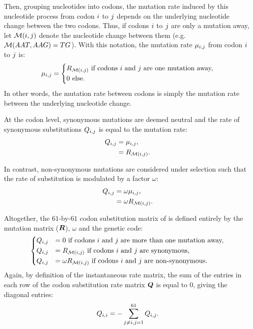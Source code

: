 Then, grouping nucleotides into codons, the mutation rate induced by this nucleotide process from codon ${i}$ to ${j}$ depends on the underlying nucleotide change between the two codons.
Thus, if codons ${i}$ to ${j}$ are only a mutation away, let $\mathcal{M}({i}, {j})$ denote the nucleotide change between them (e.g.~$\mathcal{M}(AAT, AAG) = TG$).
With this notation, the mutation rate $\mu_{{i}, {j}}$ from codon ${i}$ to ${j}$ is:
\begin{equation}
    \mu_{{i}, {j}} =
    \begin{dcases}
        R_{\mathcal{M}({i}, {j})} \text{ if codons ${i}$ and ${j}$ are one mutation away,} \\
        0 \text{ else.}
    \end{dcases}
\end{equation}
In other words, the mutation rate between codons is simply the mutation rate between the underlying nucleotide change.

At the codon level, synonymous mutations are deemed neutral and the rate of synonymous substitutions ${Q_{{i}, {j}}}$ is equal to the mutation rate:
\begin{align}
    Q_{{i}, {j}} & = \mu_{{i}, {j}}, \\
    & = R_{\mathcal{M}({i}, {j})}.
\end{align}

In contrast, non-synonymous mutations are considered under selection such that the rate of substitution is modulated by a factor $\omega$:
\begin{align}
    Q_{{i}, {j}} & = \omega \mu_{{i}, {j}}, \\
    & = \omega R_{\mathcal{M}({i}, {j})}.
\end{align}

Altogether, the $61$-by-$61$ codon substitution matrix of \citet{Muse1994} is defined entirely by the mutation matrix ($\bm{R}$), $\omega$ and the genetic code:
\begin{equation}
    \begin{dcases}
        Q_{{i}, {j}} & = 0 \text{ if codons ${i}$ and ${j}$ are more than one mutation away,} \\
        Q_{{i}, {j}} & = R_{\mathcal{M}({i}, {j})} \text{ if codons ${i}$ and ${j}$ are synonymous,} \\
        Q_{{i}, {j}} & = \omega R_{\mathcal{M}({i}, {j})} \text{ if codons ${i}$ and ${j}$ are non-synonymous}.
    \end{dcases}
    \label{eq:codon-models}
\end{equation}
Again, by definition of the instantaneous rate matrix, the sum of the entries in each row of the codon substitution rate matrix $\bm{Q}$ is equal to $0$, giving the diagonal entries:
\begin{equation}
    Q_{{i}, {i}} = - \sum\limits_{{j} \neq {i}, {j} = 1}^{61} Q_{{i}, {j}}.
\end{equation}

